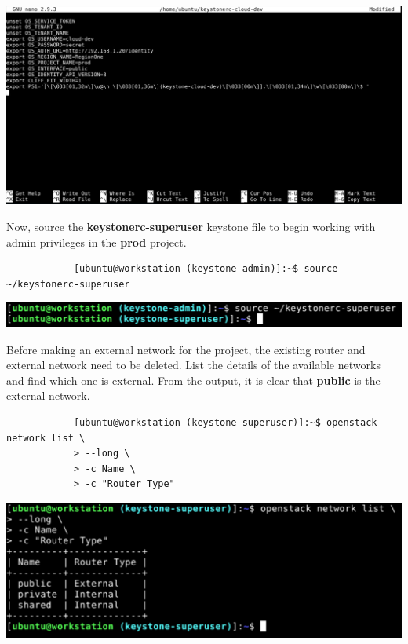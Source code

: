 \documentclass[letterpaper, 12pt]{article}
\begin{document}
\begin{enumerate}
\begin{labstep}
        \begin{center}
            \includegraphics[width=\linewidth]{images/part1/step12.png}
        \end{center}
    \end{labstep}

    \begin{labstep}
        Now, source the \textbf{keystonerc-superuser} keystone file to begin working with admin privileges in the \textbf{prod} project.
        \begin{lstlisting}
            [ubuntu@workstation (keystone-admin)]:~$ source ~/keystonerc-superuser
        \end{lstlisting}

        \begin{center}
            \includegraphics[width=\linewidth]{images/part1/step13.png}
        \end{center}
    \end{labstep}

    \begin{labstep}
        Before making an external network for the project, the existing router and external network need to be deleted.
        List the details of the available networks and find which one is external.
        From the output, it is clear that \textbf{public} is the external network.
        \begin{lstlisting}
            [ubuntu@workstation (keystone-superuser)]:~$ openstack network list \
            > --long \
            > -c Name \
            > -c "Router Type"
        \end{lstlisting}

        \begin{center}
            \includegraphics[width=\linewidth]{images/part1/step14.png}
        \end{center}
    \end{labstep}


\end{enumerate}
\end{document}
